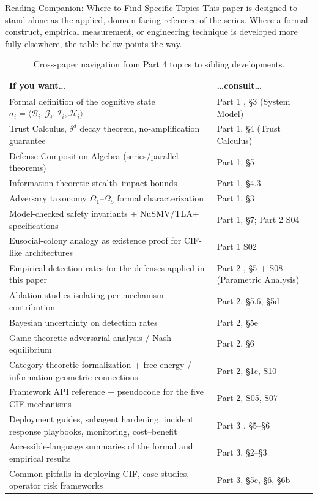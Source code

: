 \documentclass[
  ignorenonframetext,
]{beamer}
\begin{document}
\begin{frame}[allowframebreaks]{Reading Companion: Where to Find
Specific Topics}
\protect{}\label{sec:reading-companion}
This paper is designed to stand alone as the applied, domain-facing
reference of the series. Where a formal construct, empirical
measurement, or engineering technique is developed more fully elsewhere,
the table below points the way.

\begin{table}[htbp]
\centering
\caption{Cross-paper navigation from Part 4 topics to sibling developments.}
\label{tab:part4-navigation}
\small
\begin{tabular}{@{}p{}p{}@{}}
\toprule
If you want\ldots & \ldots consult\ldots \\
\midrule
Formal definition of the cognitive state $\sigma_i = \langle \mathcal{B}_i, \mathcal{G}_i, \mathcal{I}_i, \mathcal{H}_i \rangle$ & Part 1 \cite{friedman2026cogsec1}, \S{3} (System Model) \\
Trust Calculus, $\delta^d$ decay theorem, no-amplification guarantee & Part 1, \S{4} (Trust Calculus) \\
Defense Composition Algebra (series/parallel theorems) & Part 1, \S{5} \\
Information-theoretic stealth--impact bounds & Part 1, \S{4.3} \\
Adversary taxonomy $\Omega_1$--$\Omega_5$ formal characterization & Part 1, \S{3} \\
Model-checked safety invariants + NuSMV/TLA+ specifications & Part 1, \S{7}; Part 2 S04 \\
Eusocial-colony analogy as existence proof for CIF-like architectures & Part 1 S02 \\
Empirical detection rates for the defenses applied in this paper & Part 2 \cite{friedman2026cogsec2}, \S{5} + S08 (Parametric Analysis) \\
Ablation studies isolating per-mechanism contribution & Part 2, \S{5.6}, \S{5d} \\
Bayesian uncertainty on detection rates & Part 2, \S{5e} \\
Game-theoretic adversarial analysis / Nash equilibrium & Part 2, \S{6} \\
Category-theoretic formalization + free-energy / information-geometric connections & Part 2, \S{1c}, S10 \\
Framework API reference + pseudocode for the five CIF mechanisms & Part 2, S05, S07 \\
Deployment guides, subagent hardening, incident response playbooks, monitoring, cost--benefit & Part 3 \cite{friedman2026cogsec3}, \S{5}--\S{6} \\
Accessible-language summaries of the formal and empirical results & Part 3, \S{2}--\S{3} \\
Common pitfalls in deploying CIF, case studies, operator risk frameworks & Part 3, \S{5c}, \S{6}, \S{6b} \\
\bottomrule
\end{tabular}
\end{table}
\end{frame}
\end{document}
